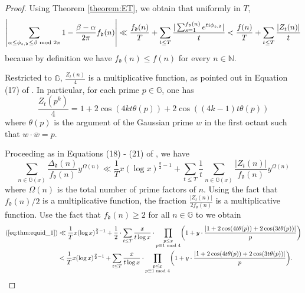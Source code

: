 \documentclass[12pt]{amsart}
\numberwithin{equation}{section} %
\theoremstyle{definition} \newtheorem{definition}[counter]{Definition}
\theoremstyle{remark} \newtheorem{nonexam}[counter]{Non-example}
\let\originalleft\left \let\originalright\right
\renewcommand{\left}{\mathopen{}\mathclose\bgroup\originalleft}
\renewcommand{\right}{\aftergroup\egroup\originalright}
\begin{document}
\begin{proof}
    Using Theorem \ref{theorem:ET}, we obtain that uniformly in $T$,
    \begin{equation}
        \left| \sum_{\alpha \leq \phi_{s,\mathfrak{d}} \leq \beta \text{ mod } 2\pi} 1 - \frac{\beta - \alpha}{2\pi} f_\mathfrak{d}(n) \right| \ll \frac{f_\mathfrak{d}(n)}{T} + \sum_{t \leq T} \frac{|\sum_{s=1}^{f_{\mathfrak{d}}(n)} e^{t i \phi_{s,\mathfrak{d}}}|}{t} < \frac{f(n)}{T} + \sum_{t \leq T} \frac{|Z_t(n)|}{t}
    \end{equation}
    because by definition we have $f_\mathfrak{d}(n) \leq f(n)$ for every $n \in \mathbb{N}$.
    
    Restricted to $\mathbb{G}$, $\frac{Z_t(n)}{4}$ is a multiplicative function, as pointed out in Equation (17) of \cite{EH99}. In particular, for each prime $p \in \mathbb{G}$, one has
    \begin{equation}
        \frac{Z_t(p^k)}{4} = 1 + 2 \cos(4kt \theta(p)) + 2 \cos((4k-1)t \theta(p))
    \end{equation}
    where $\theta(p)$ is the argument of the Gaussian prime $w$ in the first octant such that $w \cdot \overline{w} = p$.

    Proceeding as in Equations (18) - (21) of \cite{EH99}, we have
    \begin{equation} \label{eq:thm:equid_1}
        \sum_{n \in \mathbb{G}(x)} \frac{\Delta_\mathfrak{d}(n)}{f_\mathfrak{d}(n)} y^{\Omega(n)} \ll \frac{1}{T} x (\log x)^{\frac{y}{2} - 1} + \sum_{t \leq T} \frac{1}{t} \sum_{n \in \mathbb{G}(x)} \frac{|Z_t(n)|}{f_\mathfrak{d}(n)} y^{\Omega(n)}
    \end{equation}
    where $\Omega(n)$ is the total number of prime factors of $n$. Using the fact that $f_\mathfrak{d}(n)/2$ is a multiplicative function, the fraction $\frac{|Z_t(n)|}{2 f_\mathfrak{d}(n)}$ is a multiplicative function. Use the fact that $f_{\mathfrak{d}}(n) \geq 2$ for all $n \in \mathbb{G}$ to we obtain
    \begin{align*}
    \begin{split}
        (\ref{eq:thm:equid_1}) &\ll \frac{1}{T} x (\log x)^{\frac{y}{2} - 1} + \frac{1}{2} \cdot \sum_{t \leq T} \frac{x}{t \log x} \cdot \prod_{\substack{p \leq x \\ p \equiv 1 \text{ mod } 4}} \left( 1 + y \cdot \frac{|1 + 2 \cos(4t\theta(p)) + 2 \cos(3t\theta(p))|}{p} \right)  \\
        &< \frac{1}{T} x (\log x)^{\frac{y}{2} - 1} + \sum_{t \leq T} \frac{x}{t \log x} \cdot \prod_{\substack{p \leq x \\ p \equiv 1 \text{ mod } 4}} \left( 1 + y \cdot \frac{|1 + 2 \cos(4t\theta(p)) + 2 \cos(3t\theta(p))|}{p} \right).
    \end{split}
    \end{align*}


\end{proof}
\end{document}
